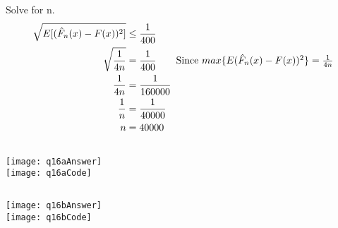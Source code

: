 \section{}

Solve for n.
\begin{align*}
    \sqrt{E[(\hat{F}_n(x) - F(x))^2]} &\leq \frac{1}{400} \\
    \sqrt{\frac{1}{4n}} &= \frac{1}{400} \tag*{Since $max\{E(\hat{F}_n(x) - F(x))^2\} = \frac{1}{4n}$} \\
    \frac{1}{4n} &= \frac{1}{160000} \\
    \frac{1}{n} &= \frac{1}{40000} \\
    n &= 40000
\end{align*}

\subsection{}
\texttt{[image: q16aAnswer]}
\\
\texttt{[image: q16aCode]}

\subsection{}
\texttt{[image: q16bAnswer]}
\\
\texttt{[image: q16bCode]}


